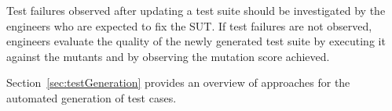 Test failures observed after updating a test suite should be investigated by the engineers who are expected to fix the SUT.
If test failures are not observed, engineers evaluate the quality of the newly generated test suite by executing it against the mutants and by observing the mutation score achieved. 

Section~\ref{sec:testGeneration} provides an overview of approaches for the automated generation of test cases.






